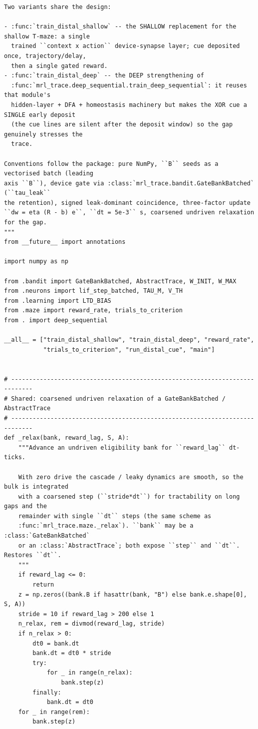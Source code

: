 \begin{lstlisting}[caption={mrl\_trace/distal\_cue.py},label={lst:siox-src-distal_cue}]
Two variants share the design:

- :func:`train_distal_shallow` -- the SHALLOW replacement for the shallow T-maze: a single
  trained ``context x action`` device-synapse layer; cue deposited once, trajectory/delay,
  then a single gated reward.
- :func:`train_distal_deep` -- the DEEP strengthening of
  :func:`mrl_trace.deep_sequential.train_deep_sequential`: it reuses that module's
  hidden-layer + DFA + homeostasis machinery but makes the XOR cue a SINGLE early deposit
  (the cue lines are silent after the deposit window) so the gap genuinely stresses the
  trace.

Conventions follow the package: pure NumPy, ``B`` seeds as a vectorised batch (leading
axis ``B``), device gate via :class:`mrl_trace.bandit.GateBankBatched` (``tau_leak``
the retention), signed leak-dominant coincidence, three-factor update
``dw = eta (R - b) e``, ``dt = 5e-3`` s, coarsened undriven relaxation for the gap.
"""
from __future__ import annotations

import numpy as np

from .bandit import GateBankBatched, AbstractTrace, W_INIT, W_MAX
from .neurons import lif_step_batched, TAU_M, V_TH
from .learning import LTD_BIAS
from .maze import reward_rate, trials_to_criterion
from . import deep_sequential

__all__ = ["train_distal_shallow", "train_distal_deep", "reward_rate",
           "trials_to_criterion", "run_distal_cue", "main"]


# ----------------------------------------------------------------------------
# Shared: coarsened undriven relaxation of a GateBankBatched / AbstractTrace
# ----------------------------------------------------------------------------
def _relax(bank, reward_lag, S, A):
    """Advance an undriven eligibility bank for ``reward_lag`` dt-ticks.

    With zero drive the cascade / leaky dynamics are smooth, so the bulk is integrated
    with a coarsened step (``stride*dt``) for tractability on long gaps and the
    remainder with single ``dt`` steps (the same scheme as
    :func:`mrl_trace.maze._relax`). ``bank`` may be a :class:`GateBankBatched`
    or an :class:`AbstractTrace`; both expose ``step`` and ``dt``. Restores ``dt``.
    """
    if reward_lag <= 0:
        return
    z = np.zeros((bank.B if hasattr(bank, "B") else bank.e.shape[0], S, A))
    stride = 10 if reward_lag > 200 else 1
    n_relax, rem = divmod(reward_lag, stride)
    if n_relax > 0:
        dt0 = bank.dt
        bank.dt = dt0 * stride
        try:
            for _ in range(n_relax):
                bank.step(z)
        finally:
            bank.dt = dt0
    for _ in range(rem):
        bank.step(z)



\end{lstlisting}
